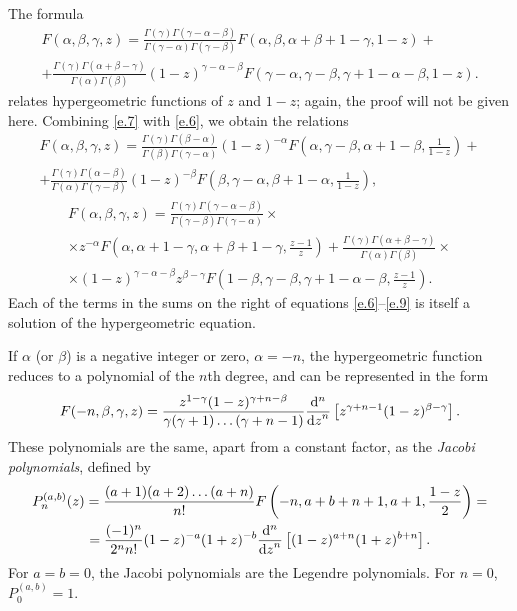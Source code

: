 The formula
\begin{multline}\label{e.7}
F(\alpha,\beta,\gamma,z)=\frac{\Gamma(\gamma)\Gamma(\gamma-\alpha-\beta)}{\Gamma(\gamma-\alpha)\Gamma(\gamma-\beta)}F(\alpha,\beta,\alpha+\beta+1-\gamma,1-z)+\\
+\frac{\Gamma(\gamma)\Gamma(\alpha+\beta-\gamma)}{\Gamma(\alpha)\Gamma(\beta)}(1-z)^{\gamma-\alpha-\beta}F(\gamma-\alpha,\gamma-\beta,\gamma+1-\alpha-\beta,1-z).
\end{multline}
relates hypergeometric functions of $ z $ and $ 1 - z $; again, the proof will not be given here. Combining \eqref{e.7} with \eqref{e.6}, we obtain the relations
\begin{multline}\label{e.8}
F(\alpha,\beta,\gamma,z)=\frac{\Gamma(\gamma)\Gamma(\beta-\alpha)}{\Gamma(\beta)\Gamma(\gamma-\alpha)}(1-z)^{-\alpha}F\left(\alpha,\gamma-\beta,\alpha+1-\beta,\frac{1}{1-z} \right)+\\
+\frac{\Gamma(\gamma)\Gamma(\alpha-\beta)}{\Gamma(\alpha)\Gamma(\gamma-\beta)}(1-z)^{-\beta}F(\beta,\gamma-\alpha,\beta+1-\alpha,\frac{1}{1-z}),
\end{multline}
\begin{multline}\label{e.9}
F(\alpha,\beta,\gamma,z)=\frac{\Gamma(\gamma)\Gamma(\gamma-\alpha-\beta)}{\Gamma(\gamma-\beta)\Gamma(\gamma-\alpha)}\times\\
\times z^{-\alpha}F\left(\alpha,\alpha+1-\gamma,\alpha+\beta+1-\gamma,\frac{z-1}{z} \right)+\frac{\Gamma(\gamma)\Gamma(\alpha+\beta-\gamma)}{\Gamma(\alpha)\Gamma(\beta)}\times\\
\times(1-z)^{\gamma-\alpha-\beta}z^{\beta-\gamma}F\left(1-\beta,\gamma-\beta,\gamma+1-\alpha-\beta,\frac{z-1}{z} \right).
\end{multline}
Each of the terms in the sums on the right of equations \eqref{e.6}--\eqref{e.9} is itself a solution of the hypergeometric equation.

If $\alpha$ (or $\beta$) is a negative integer or zero, $ \alpha = -n $, the hypergeometric function reduces to a polynomial of the $ n $th degree, and can be represented in the form
\begin{equation}\label{e.10}
F(-n,\beta,\gamma,z)=\frac{z^{1-\gamma}(1-z)^{\gamma+n-\beta}}{\gamma(\gamma+1)\dots(\gamma+n-1)}\frac{\mathrm{d}^n}{{\mathrm{d} z}^n}\left[z^{\gamma+n-1}(1-z)^{\beta-\gamma} \right].
\end{equation}
These polynomials are the same, apart from a constant factor, as the \textit{Jacobi polynomials}, defined by
\begin{multline}\label{e.11}
P_n^{(a,b)}(z)=\frac{(a+1)(a+2)\dots(a+n)}{n!}F\left(-n,a+b+n+1,a+1,\frac{1-z}{2} \right)=\\
=\frac{(-1)^n}{2^n n!}(1-z)^{-a}(1+z)^{-b}\frac{\mathrm{d}^n}{{\mathrm{d} z}^n}\left[(1-z)^{a+n}(1+z)^{b+n} \right].
\end{multline}
For $ a = b = 0 $, the Jacobi polynomials are the Legendre polynomials. For $ n = 0 $, $ P_0^{(a, b)} = 1 $.




